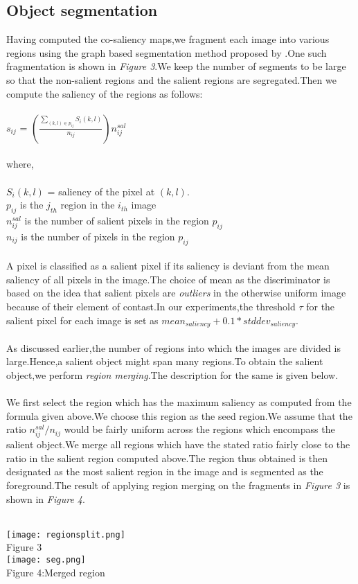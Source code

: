 \documentclass{article}
\begin{document}
\subsection{Object segmentation}
Having computed the co-saliency maps,we fragment each image into various regions using the graph based segmentation method proposed by \cite{Felzenszwalb:2004:EGI:981793.981796}.One such fragmentation is shown in \emph{Figure 3}.We keep the number of segments to be large so that the non-salient regions and the salient regions are segregated.Then we compute the saliency of the regions as follows:\\\\
\hspace*{3 cm} $s_{ij}$ = $(\frac{\sum_{(k,l)\in p_{ij}} S_i(k,l)}{n_{ij}})n^{sal}_{ij}$\\\\
\normalsize
where,\\\\
$S_i(k,l)$ = saliency of the pixel at $(k,l)$.\\
$p_{ij}$ is the $j_{th}$ region in the $i_{th}$ image\\
$n^{sal}_{ij}$ is the number of salient pixels in the region $p_{ij}$\\
$n_{ij}$ is the number of pixels in the region $p_{ij}$\\\\
A pixel is classified as a salient pixel if its saliency is deviant from the mean saliency of all pixels in the image.The choice of mean as the discriminator is based on the idea that salient pixels are \emph{outliers} in the otherwise uniform image because of their element of contast.In our experiments,the threshold $\tau$ for the salient pixel for each image is set as $mean_{saliency}+0.1*stddev_{saliency}$.\\\\
As discussed earlier,the number of regions into which the images are divided is large.Hence,a salient object might span many regions.To obtain the salient object,we perform \emph{region merging}.The description for the same is given below.\\\\
We first select the region which has the maximum saliency as computed from the formula given above.We choose this region as the seed region.We assume that the ratio $n^{sal}_{ij}/n_{ij}$ would be fairly uniform across the regions which encompass the salient object.We merge all regions which have the stated ratio fairly close to the ratio in the salient region computed above.The region thus obtained is then designated as the most salient region in the image and is segmented as the foreground.The result of applying region merging on the fragments in \emph{Figure 3} is shown in \emph{Figure 4}.\\\\
\begin{center}
\texttt{[image: regionsplit.png]}\\
Figure 3\\
\vspace{0.8 cm}
\texttt{[image: seg.png]}\\
Figure 4:Merged region\\
\end{center}
\newpage
\end{document}
